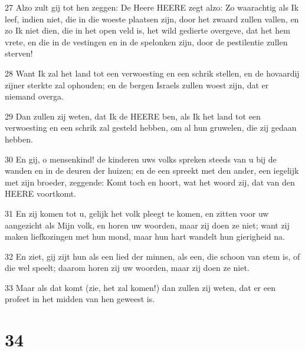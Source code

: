 \par 27 Alzo zult gij tot hen zeggen: De Heere HEERE zegt alzo: Zo waarachtig als Ik leef, indien niet, die in die woeste plaatsen zijn, door het zwaard zullen vallen, en zo Ik niet dien, die in het open veld is, het wild gedierte overgeve, dat het hem vrete, en die in de vestingen en in de spelonken zijn, door de pestilentie zullen sterven!
\par 28 Want Ik zal het land tot een verwoesting en een schrik stellen, en de hovaardij zijner sterkte zal ophouden; en de bergen Israels zullen woest zijn, dat er niemand overga.
\par 29 Dan zullen zij weten, dat Ik de HEERE ben, als Ik het land tot een verwoesting en een schrik zal gesteld hebben, om al hun gruwelen, die zij gedaan hebben.
\par 30 En gij, o mensenkind! de kinderen uws volks spreken steeds van u bij de wanden en in de deuren der huizen; en de een spreekt met den ander, een iegelijk met zijn broeder, zeggende: Komt toch en hoort, wat het woord zij, dat van den HEERE voortkomt.
\par 31 En zij komen tot u, gelijk het volk pleegt te komen, en zitten voor uw aangezicht als Mijn volk, en horen uw woorden, maar zij doen ze niet; want zij maken liefkozingen met hun mond, maar hun hart wandelt hun gierigheid na.
\par 32 En ziet, gij zijt hun als een lied der minnen, als een, die schoon van stem is, of die wel speelt; daarom horen zij uw woorden, maar zij doen ze niet.
\par 33 Maar als dat komt (zie, het zal komen!) dan zullen zij weten, dat er een profeet in het midden van hen geweest is.

\chapter{34}

